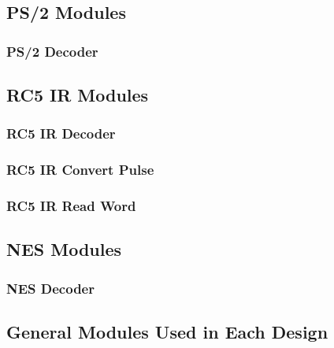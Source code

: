 \documentclass[12pt]{article}
\begin{document}
\subsection{PS/2 Modules}

\subsubsection{PS/2 Decoder}

\subsection{RC5 IR Modules}

\subsubsection{RC5 IR Decoder}

\subsubsection{RC5 IR Convert Pulse}

\subsubsection{RC5 IR Read Word}

\subsection{NES Modules}

\subsubsection{NES Decoder}

\subsection{General Modules Used in Each Design}
\end{document}
